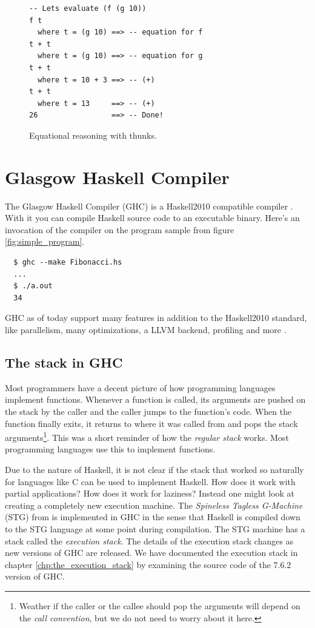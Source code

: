 \begin{figure}
\begin{mdframed}
  \begin{verbatim}
-- Lets evaluate (f (g 10))
f t
  where t = (g 10) ==> -- equation for f
t + t
  where t = (g 10) ==> -- equation for g
t + t
  where t = 10 + 3 ==> -- (+)
t + t
  where t = 13     ==> -- (+)
26                 ==> -- Done!
  \end{verbatim}
  \caption{Equational reasoning with thunks.}
  \label{fig:thunks_er}
\end{mdframed}
\end{figure}

\section{Glasgow Haskell Compiler}

The Glasgow Haskell Compiler (GHC) is a Haskell2010 compatible compiler
\cite{ghc_website}. With it you can compile Haskell source code to an executable
binary. Here's an invocation of the compiler on the program sample from figure \ref{fig:simple_program}.

\begin{verbatim}
  $ ghc --make Fibonacci.hs
  ...
  $ ./a.out
  34
\end{verbatim}

GHC as of today support many features in addition to the Haskell2010
standard, like parallelism, many optimizations, a LLVM backend, profiling
and more \cite{ghc_website}.

\subsection{The stack in GHC} \label{sec:stack_in_GHC}

Most programmers have a decent picture of how programming languages
implement functions. Whenever a function is called, its arguments are
pushed on the stack by the caller and the caller jumps to the function's
code. When the function finally exits, it returns to where it was called
from and pops the stack arguments\footnote{Weather if the caller or the callee
should pop the arguments will depend on the \emph{call convention}, but
we do not need to worry about it here.}.  This was a short reminder of how
the \emph{regular stack} works. Most programming languages use this to
implement functions.

Due to the nature of Haskell, it is not clear if the stack that worked
so naturally for languages like C can be used to implement Haskell.
How does it work with partial applications? How does it work for
laziness? Instead one might look at creating a completely new execution
machine. The \emph{Spineless Tagless G-Machine} (STG) from
\cite{stg_1992} is implemented in GHC \cite{evalapplyjfp06} in the sense
that Haskell is compiled down to the STG language at some point during compilation.
The STG machine has a stack called the \emph{execution stack}. The details
of the execution stack changes as new versions of GHC are released.
We have documented the execution stack in chapter
\ref{chp:the_execution_stack} by examining the source code of
the 7.6.2 version of GHC.

